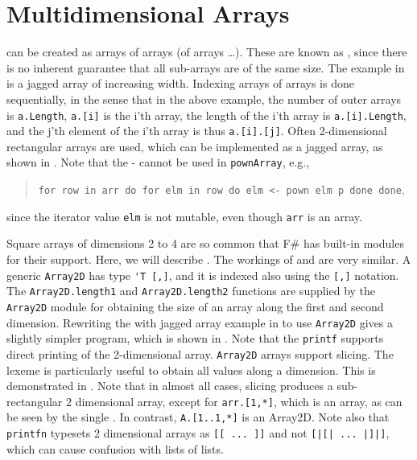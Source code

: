 \documentclass[fsharpnotes.tex]{subfiles}
\begin{document}
\section{Multidimensional Arrays}
 can be created as arrays of arrays (of arrays \dots). These are known as , since there is no inherent guarantee that all sub-arrays are of the same size. The example in  is a jagged array of increasing width.
%
%
Indexing arrays of arrays is done sequentially, in the sense that in the above example, the number of outer arrays is \lstinline|a.Length|,  \lstinline|a.[i]| is the i'th array, the length of the i'th array is \lstinline|a.[i].Length|, and the j'th element of the i'th array is thus \lstinline|a.[i].[j]|. Often 2-dimensional rectangular arrays are used, which can be implemented as a jagged array, as shown in .
%
%
Note that the - cannot be used in \lstinline!pownArray!, e.g., 
\begin{quote} 
  \mbox{\lstinline{for row in arr do for elm in row do elm <- pown elm p done done}},
 \end{quote}
since the iterator value \lstinline!elm! is not mutable, even though \lstinline!arr! is an array.

Square arrays of dimensions 2 to 4 are so common that F\# has built-in modules for their support. Here, we will describe . The workings of  and  are very similar. A generic \lstinline{Array2D} has type \lstinline{'T [,]}, and it is indexed also using the \lstinline|[,]| notation. The \lstinline{Array2D.length1} and \lstinline{Array2D.length2} functions are supplied by the \lstinline{Array2D} module for obtaining the size of an array along the first and second dimension. Rewriting the with jagged array example in  to use \lstinline{Array2D} gives a slightly simpler program, which is shown in .
%
%
Note that the \lstinline!printf! supports direct printing of the 2-dimensional array. \lstinline{Array2D} arrays support slicing. The \lexeme{*} lexeme is particularly useful to obtain all values along a dimension. This is demonstrated in .
%
%
Note that in almost all cases, slicing produces a sub-rectangular 2 dimensional array, except for \lstinline{arr.[1,*]}, which is an array, as can be seen by the single \lexeme{[}. In contrast, \lstinline{A.[1..1,*]} is an Array2D. Note also that \lstinline!printfn! typesets 2 dimensional arrays as \lstinline{[[ ... ]]} and not \lstinline{[|[| ... |]|]}, which can cause confusion with lists of lists.
\end{document}
